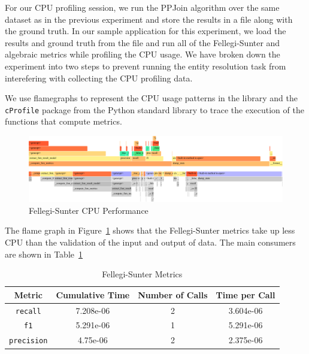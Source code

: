 \documentclass[a4paper,twoside]{article}
\begin{document}
    For our CPU profiling session, we run the PPJoin algorithm over the same
    dataset as in the previous experiment and store the results in a file
    along with the ground truth.
    In our sample application for this experiment, we load the results and 
    ground truth from the file and run all of the Fellegi-Sunter and algebraic
    metrics while profiling the CPU usage.
    We have broken down the experiment into two steps to prevent running the
    entity resolution task from interefering with collecting the CPU profiling
    data.

    We use flamegraphs\cite{flamegraphs2013} to represent the CPU usage
    patterns in the library and the \texttt{cProfile} package from the Python
    standard library to trace the execution of the functions that compute
    metrics.

    \begin{figure}[!ht]
        \centering
        \includegraphics[width=\textwidth]{performance/fs-flamegraph}
        \caption{Fellegi-Sunter CPU Performance}\label{fig:fs-cpu-perf}
    \end{figure}

    The flame graph in Figure~\ref{fig:fs-cpu-perf}
    shows that the Fellegi-Sunter metrics take up less CPU than the validation
    of the input and output of data.
    The main consumers are shown in Table~\ref{table:fs-cpu-perf}
    
    \begin{table}[ht!]
        \centering
        \begin{tabular}{c c c c}
            \toprule
            Metric & Cumulative Time & Number of Calls & Time per Call \\ [0.5ex]
            \toprule
            \texttt{recall} & 7.208e-06 & 2 & 3.604e-06 \\
            \midrule
            \texttt{f1} & 5.291e-06 & 1 & 5.291e-06 \\
            \midrule
            \texttt{precision} & 4.75e-06 & 2 & 2.375e-06 \\
            \bottomrule
        \end{tabular}
        \caption{Fellegi-Sunter Metrics}\label{table:fs-cpu-perf}
    \end{table}
\end{document}
